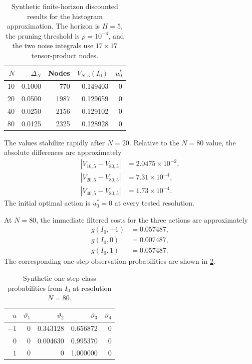 \documentclass[10pt,twocolumn]{article}
\theoremstyle{remark}
\begin{document}
\begin{table}[htbp]
	\centering
	\scriptsize
	\caption{Synthetic finite-horizon discounted results for the histogram approximation. The horizon is \(H=5\), the pruning threshold is \(\rho=10^{-4}\), and the two noise integrals use \(17\times17\) tensor-product nodes.}
	\label{tab:reference-histogram-results}
	\begin{tabular}{rrrrr}
		\hline
		\(N\) & \(\Delta_N\) & Nodes & \(V_{N,5}(I_0)\) & \(u_0^*\)\\
		\hline
		10 & 0.1000 & 770  & 0.149403 & 0\\
		20 & 0.0500 & 1987 & 0.129659 & 0\\
		40 & 0.0250 & 2156 & 0.129102 & 0\\
		80 & 0.0125 & 2325 & 0.128928 & 0\\
		\hline
	\end{tabular}
\end{table}

The values stabilize rapidly after \(N=20\). Relative to the \(N=80\) value, the absolute differences are approximately
\begin{equation*}
	\begin{aligned}
		|V_{10,5}-V_{80,5}|&=2.0475\times10^{-2},\\
		|V_{20,5}-V_{80,5}|&=7.31\times10^{-4},\\
		|V_{40,5}-V_{80,5}|&=1.73\times10^{-4}.
	\end{aligned}
	\label{eq:reference-value-differences}
\end{equation*}
The initial optimal action is \(u_0^*=0\) at every tested resolution.

At \(N=80\), the immediate filtered costs for the three actions are approximately
\begin{equation*}
	\begin{aligned}
		g(I_0,-1)&=0.057487,\\
		g(I_0,0)&=0.007487,\\
		g(I_0,1)&=0.057487.
	\end{aligned}
	\label{eq:reference-initial-stage-costs}
\end{equation*}
The corresponding one-step observation probabilities are shown in
\cref{tab:reference-initial-observation-probabilities}.

\begin{table}[htbp]
	\centering
	\scriptsize
	\caption{Synthetic one-step class probabilities from \(I_0\) at resolution \(N=80\).}
	\label{tab:reference-initial-observation-probabilities}
	\begin{tabular}{rrrrr}
		\hline
		\(u\) &
		\(\vartheta_1\) &
		\(\vartheta_2\) &
		\(\vartheta_3\) &
		\(\vartheta_4\)\\
		\hline
		\(-1\) & 0 & 0.343128 & 0.656872 & 0\\
		\(0\)  & 0 & 0.004630 & 0.995370 & 0\\
		\(1\)  & 0 & 0        & 1.000000 & 0\\
		\hline
	\end{tabular}
\end{table}
\end{document}

